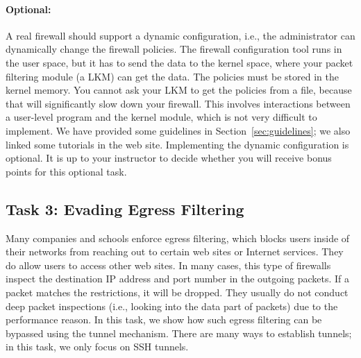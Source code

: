 \paragraph{Optional:} 
A real firewall should support a dynamic configuration, i.e.,
the administrator can dynamically change the firewall policies. 
The firewall configuration tool runs in the user space, 
but it has to send the data to the kernel space, where your 
packet filtering module (a LKM) can get the 
data. The policies must be stored in the kernel memory. 
You cannot ask your LKM to get the policies 
from a file, because that will significantly slow down 
your firewall. 
This involves interactions between a user-level program 
and the kernel module, which is not very difficult to implement. 
We have provided some guidelines in Section~\ref{sec:guidelines}; we also 
linked some tutorials in the web site. 
Implementing the dynamic configuration is optional. It is up to your 
instructor to decide whether you will receive bonus points for this
optional task.






\subsection{Task 3: Evading Egress Filtering}

Many companies and schools enforce egress filtering, which blocks users
inside of their networks from reaching out to certain web sites or Internet
services. They do allow users to access other web sites. 
In many cases, this type of firewalls inspect 
the destination IP address and port number in the outgoing packets. If 
a packet matches the restrictions, it will be dropped. 
They usually do not conduct deep packet inspections (i.e., looking into
the data part of packets) due to the performance reason. 
In this task, we show how such egress filtering can be bypassed using
the tunnel mechanism. There are many ways to establish tunnels; 
in this task, we only focus on SSH tunnels.

